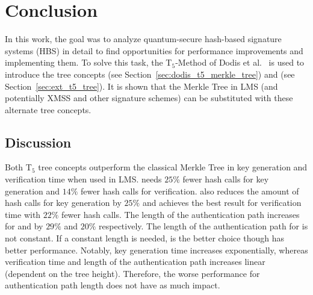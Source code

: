 \chapter{Conclusion}
\label{cha:conclusion}

In this work, the goal was to analyze quantum-secure hash-based signature systems (HBS) in detail to find opportunities for performance improvements and implementing them. 
To solve this task, the T$_5$-Method of Dodis et al.~\cite{T5_paper} is used to introduce the tree concepts \tftree (see Section~\ref{sec:dodis_t5_merkle_tree}) and \extree (see Section~\ref{sec:ext_t5_tree}). 
It is shown that the Merkle Tree in LMS (and potentially XMSS and other signature schemes) can be substituted with these alternate tree concepts.

\section{Discussion}
Both T$_5$ tree concepts outperform the classical Merkle Tree in key generation and verification time when used in LMS. \tftree needs $25\%$ fewer hash calls for key generation and $14\%$ fewer hash calls for verification. \extree also reduces the amount of hash calls for key generation by $25\%$ and achieves the best result for verification time with $22\%$ fewer hash calls.
The length of the authentication path increases for \tftree and \extree by $29\%$ and $20\%$ respectively. The length of the authentication path for \extree is not constant. If a constant length is needed, \tftree is the better choice though \extree has better performance.
Notably, key generation time increases exponentially, whereas verification time and length of the authentication path increases linear (dependent on the tree height). Therefore, the worse performance for authentication path length does not have as much impact. 

